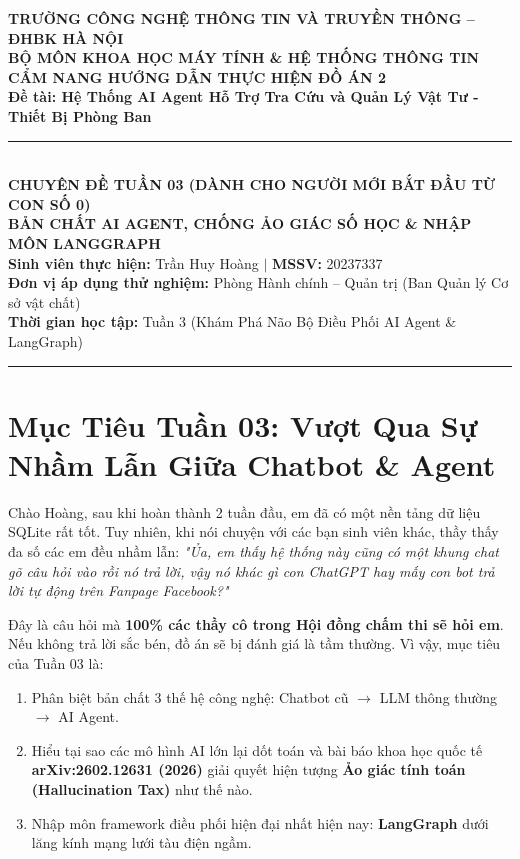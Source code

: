 \documentclass[11pt,a4paper]{article}
\begin{document}
\begin{center}
    {\large \textbf{TRƯỜNG CÔNG NGHỆ THÔNG TIN VÀ TRUYỀN THÔNG -- ĐHBK HÀ NỘI}}\\[0.2em]
    {\normalsize \textbf{BỘ MÔN KHOA HỌC MÁY TÍNH \& HỆ THỐNG THÔNG TIN}}\\[1.0em]
    
    {\Large \bfseries \color{blue!85!black} CẨM NANG HƯỚNG DẪN THỰC HIỆN ĐỒ ÁN 2}\\[0.3em]
    {\large \textbf{Đề tài: Hệ Thống AI Agent Hỗ Trợ Tra Cứu và Quản Lý Vật Tư - Thiết Bị Phòng Ban}}\\[0.8em]
    
    \rule{0.85\textwidth}{0.8pt}\\[0.6em]
    
    {\bfseries CHUYÊN ĐỀ TUẦN 03 (DÀNH CHO NGƯỜI MỚI BẮT ĐẦU TỪ CON SỐ 0)}\\[0.3em]
    {\large \bfseries BẢN CHẤT AI AGENT, CHỐNG ẢO GIÁC SỐ HỌC \& NHẬP MÔN LANGGRAPH}\\[0.8em]
    
    \small
    \textbf{Sinh viên thực hiện:} Trần Huy Hoàng \quad $\vert$ \quad \textbf{MSSV:} 20237337\\
    \textbf{Đơn vị áp dụng thử nghiệm:} Phòng Hành chính -- Quản trị (Ban Quản lý Cơ sở vật chất)\\
    \textbf{Thời gian học tập:} Tuần 3 (Khám Phá Não Bộ Điều Phối AI Agent \& LangGraph)
\end{center}

\vspace{0.2cm}
\hrule
\vspace{0.3cm}

\section{Mục Tiêu Tuần 03: Vượt Qua Sự Nhầm Lẫn Giữa Chatbot \& Agent}

Chào Hoàng, sau khi hoàn thành 2 tuần đầu, em đã có một nền tảng dữ liệu SQLite rất tốt. Tuy nhiên, khi nói chuyện với các bạn sinh viên khác, thầy thấy đa số các em đều nhầm lẫn: \textit{"Ủa, em thấy hệ thống này cũng có một khung chat gõ câu hỏi vào rồi nó trả lời, vậy nó khác gì con ChatGPT hay mấy con bot trả lời tự động trên Fanpage Facebook?"}

Đây là câu hỏi mà \textbf{100\% các thầy cô trong Hội đồng chấm thi sẽ hỏi em}. Nếu không trả lời sắc bén, đồ án sẽ bị đánh giá là tầm thường. Vì vậy, mục tiêu của Tuần 03 là:
\begin{enumerate}
    \item Phân biệt bản chất 3 thế hệ công nghệ: Chatbot cũ $\rightarrow$ LLM thông thường $\rightarrow$ AI Agent.
    \item Hiểu tại sao các mô hình AI lớn lại dốt toán và bài báo khoa học quốc tế \textbf{arXiv:2602.12631 (2026)} giải quyết hiện tượng \textbf{Ảo giác tính toán (Hallucination Tax)} như thế nào.
    \item Nhập môn framework điều phối hiện đại nhất hiện nay: \textbf{LangGraph} dưới lăng kính mạng lưới tàu điện ngầm.
\end{enumerate}
\end{document}
